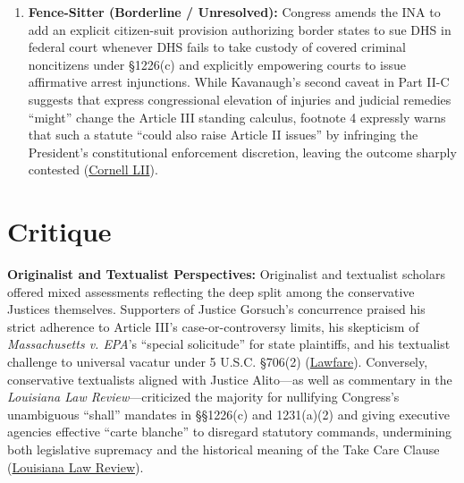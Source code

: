 \documentclass[12pt]{article}
\begin{document}
\begin{enumerate}
\item \textbf{Fence-Sitter (Borderline / Unresolved):} Congress amends the INA to add an explicit citizen-suit provision authorizing border states to sue DHS in federal court whenever DHS fails to take custody of covered criminal noncitizens under \S 1226(c) and explicitly empowering courts to issue affirmative arrest injunctions. While Kavanaugh's second caveat in Part II-C suggests that express congressional elevation of injuries and judicial remedies ``might'' change the Article III standing calculus, footnote 4 expressly warns that such a statute ``could also raise Article II issues'' by infringing the President's constitutional enforcement discretion, leaving the outcome sharply contested (\href{https://www.law.cornell.edu/supremecourt/text/22-58}{Cornell LII}).
\end{enumerate}

\section{Critique}

\textbf{Originalist and Textualist Perspectives:} Originalist and textualist scholars offered mixed assessments reflecting the deep split among the conservative Justices themselves. Supporters of Justice Gorsuch's concurrence praised his strict adherence to Article III's case-or-controversy limits, his skepticism of \textit{Massachusetts v. EPA}'s ``special solicitude'' for state plaintiffs, and his textualist challenge to universal vacatur under 5 U.S.C. \S 706(2) (\href{https://www.lawfaremedia.org/article/united-states-v.-texas-explained}{Lawfare}). Conversely, conservative textualists aligned with Justice Alito---as well as commentary in the \textit{Louisiana Law Review}---criticized the majority for nullifying Congress's unambiguous ``shall'' mandates in \S\S 1226(c) and 1231(a)(2) and giving executive agencies effective ``carte blanche'' to disregard statutory commands, undermining both legislative supremacy and the historical meaning of the Take Care Clause (\href{https://lawreview.law.lsu.edu/archives/3081}{Louisiana Law Review}).
\end{document}
